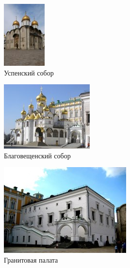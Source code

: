 \begin{figure}[ht]
    \centering
    \includegraphics{img/rus/4.jpg}
    \caption{Успенский собор}\label{fig:rus:4}
\end{figure}

\begin{figure}[ht]
    \centering
    \includegraphics{img/rus/5.jpg}
    \caption{Благовещенский собор}\label{fig:rus:5}
\end{figure}

\begin{figure}[ht]
    \centering
    \includegraphics{img/rus/6.jpg}
    \caption{Гранитовая палата}\label{fig:rus:6}
\end{figure}

